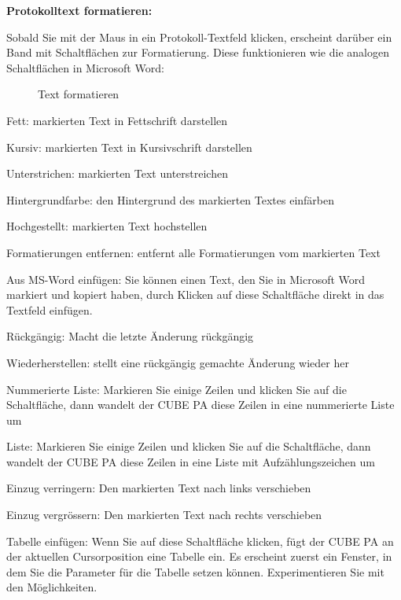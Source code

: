 \vspace{\baselineskip}

\textbf{Protokolltext formatieren:}


Sobald Sie mit der Maus in ein Protokoll-Textfeld klicken, erscheint darüber ein Band mit Schaltflächen  zur Formatierung. Diese funktionieren wie die analogen Schaltflächen in Microsoft Word:

\begin{figure}[H]
\caption{Text formatieren}
\end{figure}

\begin{compactitem}
\item Fett: markierten Text in Fettschrift darstellen
\item Kursiv: markierten Text in Kursivschrift darstellen
\item Unterstrichen: markierten Text unterstreichen
\item Hintergrundfarbe: den Hintergrund des markierten Textes einfärben
\item Hochgestellt: markierten Text hochstellen
\item Formatierungen entfernen: entfernt alle Formatierungen vom markierten Text
\item Aus MS-Word einfügen: Sie können einen Text, den Sie in Microsoft Word markiert und kopiert haben, durch Klicken auf
diese Schaltfläche direkt in das Textfeld einfügen.
\item Rückgängig: Macht die letzte Änderung rückgängig
\item Wiederherstellen: stellt eine rückgängig gemachte Änderung wieder her
\item Nummerierte Liste: Markieren Sie einige Zeilen und klicken Sie auf die Schaltfläche, dann wandelt der CUBE PA diese
Zeilen in eine nummerierte Liste um
\item Liste: Markieren Sie einige Zeilen und klicken Sie auf die Schaltfläche, dann wandelt der CUBE PA diese Zeilen in eine
Liste mit Aufzählungszeichen um
\item Einzug verringern: Den markierten Text nach links verschieben
\item Einzug vergrössern: Den markierten Text nach rechts verschieben
\item Tabelle einfügen: Wenn Sie auf diese Schaltfläche klicken, fügt der CUBE PA an der aktuellen Cursorposition eine Tabelle
ein. Es erscheint zuerst ein Fenster, in dem Sie die Parameter für die Tabelle setzen können. Experimentieren Sie mit
den Möglichkeiten.
\end{compactitem}

